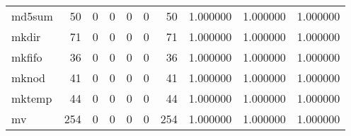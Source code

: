 \begin{longtable}{lrrrrrrrrr}
md5sum    &                                        50 &                                                  0 &                                                  0 &                                                  0 &                                                  0 &                                                 50 &                                           1.000000 &                               1.000000 &                             1.000000 \\
mkdir     &                                        71 &                                                  0 &                                                  0 &                                                  0 &                                                  0 &                                                 71 &                                           1.000000 &                               1.000000 &                             1.000000 \\
mkfifo    &                                        36 &                                                  0 &                                                  0 &                                                  0 &                                                  0 &                                                 36 &                                           1.000000 &                               1.000000 &                             1.000000 \\
mknod     &                                        41 &                                                  0 &                                                  0 &                                                  0 &                                                  0 &                                                 41 &                                           1.000000 &                               1.000000 &                             1.000000 \\
mktemp    &                                        44 &                                                  0 &                                                  0 &                                                  0 &                                                  0 &                                                 44 &                                           1.000000 &                               1.000000 &                             1.000000 \\
mv        &                                       254 &                                                  0 &                                                  0 &                                                  0 &                                                  0 &                                                254 &                                           1.000000 &                               1.000000 &                             1.000000 \\

\end{longtable}
